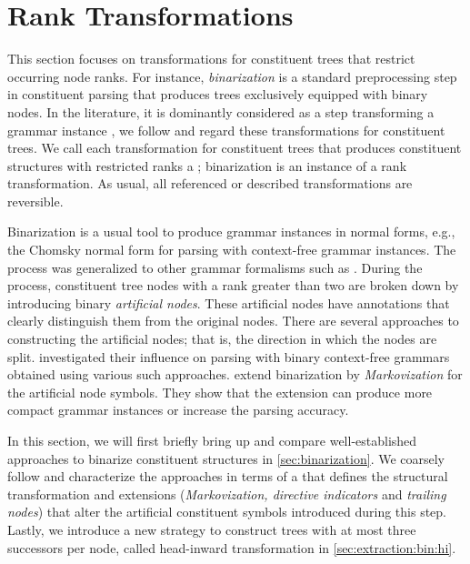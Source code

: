 \documentclass[../../document.tex]{subfiles}
\begin{document}
    \section{Rank Transformations}\label{sec:ranktransformations}
    This section focuses on transformations for constituent trees that restrict occurring node ranks.
    For instance, \emph{binarization} is a standard preprocessing step in constituent parsing that produces trees exclusively equipped with binary nodes.
    In the literature, it is dominantly considered as a step transforming a grammar instance \citep[e.g.\@][]{KleMan03,Son08,Kal10}, we follow \citet{CraSchBod16} and regard these transformations for constituent trees.
    We call each transformation for constituent trees that produces constituent structures with restricted ranks a ; binarization is an instance of a rank transformation.
    As usual, all referenced or described transformations are reversible.

    Binarization is a usual tool to produce grammar instances in normal forms, e.g., the Chomsky normal form for parsing with context-free grammar instances.
    The process was generalized to other grammar formalisms such as  \citep{Kal10, Cra12}.
    During the process, constituent tree nodes with a rank greater than two are broken down by introducing binary \emph{artificial nodes}.
    These artificial nodes have annotations that clearly distinguish them from the original nodes.
    There are several approaches to constructing the artificial nodes; that is, the direction in which the nodes are split.
     investigated their influence on parsing with binary context-free grammars obtained using various such approaches.
     extend binarization by \emph{Markovization} for the artificial node symbols.
    They show that the extension can produce more compact grammar instances or increase the parsing accuracy.

    In this section, we will first briefly bring up and compare well-established approaches to binarize constituent structures in \cref{sec:binarization}.
    We coarsely follow \citet{Cra12} and characterize the approaches in terms of a  that defines the structural transformation and extensions (\emph{Markovization, directive indicators} and \emph{trailing nodes}) that alter the artificial constituent symbols introduced during this step.
    Lastly, we introduce a new strategy to construct trees with at most three successors per node, called head-inward transformation in \cref{sec:extraction:bin:hi}.
\end{document}
